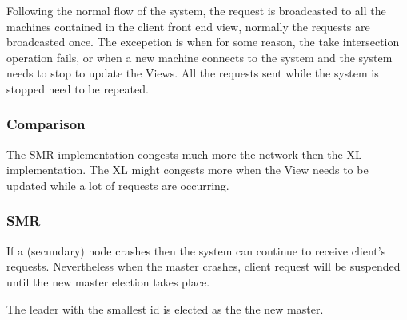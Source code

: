\documentclass[times, 10pt,twocolumn]{article}
\begin{document}

Following the normal flow of the system, the request is broadcasted to all the machines contained in the client front end view, normally the requests
are broadcasted once. The excepetion is when for some reason, the take intersection operation fails, or when a new machine connects to the system and 
the system needs to stop to update the Views. All the requests sent while the system is stopped need to be repeated.

\subsubsection{Comparison}


The SMR implementation congests much more the network then the XL implementation. The XL might congests more when the View needs to be updated while
a lot of requests are occurring.

\subsubsection{SMR}


If a (secundary) node crashes then the system can continue to receive client's requests. Nevertheless when the master crashes, client request will be suspended until the new master election takes place.

The leader with the smallest id is elected as the the new master.
\end{document}
